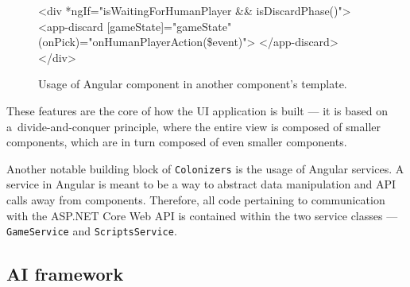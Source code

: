 \begin{figure}[ht]
\begin{code}[commandchars=\\\{\},codes={\catcode`\$=3\catcode`\^=7\catcode`\_=8}]
<div *ngIf="isWaitingForHumanPlayer && isDiscardPhase()">
    <app-discard [gameState]="gameState"
                 (onPick)="onHumanPlayerAction(\$event)">
    </app-discard>
</div>
\end{code}
\caption{Usage of Angular component in another component's template.}\label{dd:componentref}
\end{figure}

These features are the core of how the UI application is built --- it is based on
a~divide-and-conquer principle, where the entire view is composed of smaller components,
which are in turn composed of even smaller components.

Another notable building block of \texttt{Colonizers} is the usage of Angular
services. A service in Angular is meant to be a way to abstract data manipulation
and API calls away from components. Therefore, all code pertaining to
communication with the ASP.NET Core Web API is contained within
the two service classes --- \texttt{GameService} and \texttt{ScriptsService}.

\subsection{AI framework}

